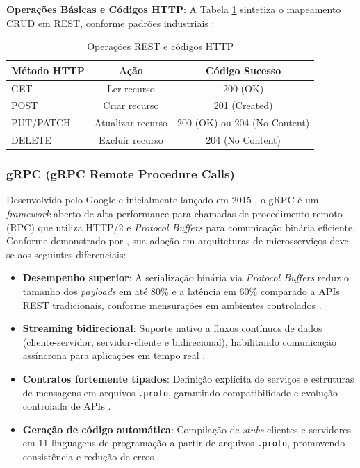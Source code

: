 \textbf{Operações Básicas e Códigos HTTP}:
A Tabela \ref{tab:rest_operations} sintetiza o mapeamento CRUD em REST, conforme padrões industriais \cite{fielding2000rest}:

\begin{table}[h]
\centering
\caption{Operações REST e códigos HTTP}
\label{tab:rest_operations}
\begin{tabular}{|l|c|c|}
\hline
\textbf{Método HTTP} & \textbf{Ação} & \textbf{Código Sucesso} \\ \hline
GET & Ler recurso & 200 (OK) \\ \hline
POST & Criar recurso & 201 (Created) \\ \hline
PUT/PATCH & Atualizar recurso & 200 (OK) ou 204 (No Content) \\ \hline
DELETE & Excluir recurso & 204 (No Content) \\ \hline
\end{tabular}
\end{table}


\subsubsection{\gls{gRPC} (gRPC Remote Procedure Calls)}
Desenvolvido pelo Google e inicialmente lançado em 2015 \cite{googleblog:5}, o \gls{gRPC} é um \textit{framework} aberto de alta performance para chamadas de procedimento remoto (RPC) que utiliza \gls{HTTP/2} e \textit{Protocol Buffers} para comunicação binária eficiente. Conforme demonstrado por \cite{niswar2023performance}, sua adoção em arquiteturas de microsserviços deve-se aos seguintes diferenciais:

\begin{itemize}
\item \textbf{Desempenho superior}: A serialização binária via \textit{Protocol Buffers} reduz o tamanho dos \textit{payloads} em até 80\% e a latência em 60\% comparado a APIs REST tradicionais, conforme mensurações em ambientes controlados \cite{niswar2023performance}.
\item \textbf{Streaming bidirecional}: Suporte nativo a fluxos contínuos de dados (cliente-servidor, servidor-cliente e bidirecional), habilitando comunicação assíncrona para aplicações em tempo real \cite{grpc:1}.
\item \textbf{Contratos fortemente tipados}: Definição explícita de serviços e estruturas de mensagens em arquivos \texttt{.proto}, garantindo compatibilidade e evolução controlada de APIs \cite{maso2024comparativo}.
\item \textbf{Geração de código automática}: Compilação de \textit{stubs} clientes e servidores em 11 linguagens de programação a partir de arquivos \texttt{.proto}, promovendo consistência e redução de erros \cite{grpc:1}.
\end{itemize}

